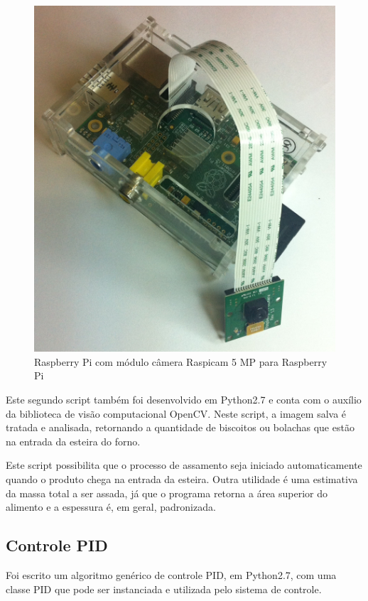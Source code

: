\begin{figure}[H]
\centering
\includegraphics[width=\textwidth]{Figuras/raspicam}
\caption{Raspberry Pi com módulo câmera Raspicam 5 MP para Raspberry Pi}
\label{fig:raspicam}
\end{figure}

Este segundo script também foi desenvolvido em Python2.7 e conta com o auxílio da biblioteca de visão computacional OpenCV. Neste script, a imagem salva é tratada e analisada, retornando a quantidade de biscoitos ou bolachas que estão na entrada da esteira do forno. 

Este script possibilita que o processo de assamento seja iniciado automaticamente quando o produto chega na entrada da esteira. Outra utilidade é uma estimativa da massa total a ser assada, já que o programa retorna a área superior do alimento e a espessura é, em geral, padronizada. 

\subsection{Controle PID}

Foi escrito um algoritmo genérico de controle PID, em Python2.7, com uma classe PID que pode ser instanciada e utilizada pelo sistema de controle. 

